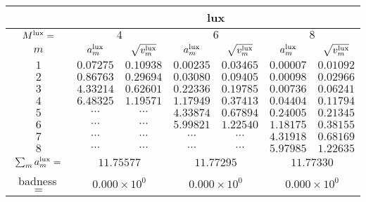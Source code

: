 \begin{tabular}{c|cc|cc|cc|}
&
\multicolumn{6}{|c|}{lux} \\
\hline
$M^{\mathrm{lux}}=$ &
 \multicolumn{2}{|c|}{$4$} &
 \multicolumn{2}{|c|}{$6$} &
 \multicolumn{2}{|c|}{$8$} \\
$m$ &
 $a^{\mathrm{lux}}_m$ & $\sqrt{v^{\mathrm{lux}}_m}$ &
 $a^{\mathrm{lux}}_m$ & $\sqrt{v^{\mathrm{lux}}_m}$ &
 $a^{\mathrm{lux}}_m$ & $\sqrt{v^{\mathrm{lux}}_m}$ \\
$1$ &
 $0.07275$ & $0.10938$ &
 $0.00235$ & $0.03465$ &
 $0.00007$ & $0.01092$ \\
$2$ &
 $0.86763$ & $0.29694$ &
 $0.03080$ & $0.09405$ &
 $0.00098$ & $0.02966$ \\
$3$ &
 $4.33214$ & $0.62601$ &
 $0.22336$ & $0.19785$ &
 $0.00736$ & $0.06241$ \\
$4$ &
 $6.48325$ & $1.19571$ &
 $1.17949$ & $0.37413$ &
 $0.04404$ & $0.11794$ \\
$5$ &
 $\cdots$ & $\cdots$ &
 $4.33874$ & $0.67894$ &
 $0.24005$ & $0.21345$ \\
$6$ &
 $\cdots$ & $\cdots$ &
 $5.99821$ & $1.22540$ &
 $1.18175$ & $0.38155$ \\
$7$ &
 $\cdots$ & $\cdots$ &
 $\cdots$ & $\cdots$ &
 $4.31918$ & $0.68169$ \\
$8$ &
 $\cdots$ & $\cdots$ &
 $\cdots$ & $\cdots$ &
 $5.97985$ & $1.22635$ \\
\hline
$\sum_m a^{\mathrm{lux}}_m=$ &
 \multicolumn{2}{|c|}{$11.75577$} &
 \multicolumn{2}{|c|}{$11.77295$} &
 \multicolumn{2}{|c|}{$11.77330$} \\
badness\,$=$ &
 \multicolumn{2}{|c|}{$0.000\times 10^{0}$} &
 \multicolumn{2}{|c|}{$0.000\times 10^{0}$} &
 \multicolumn{2}{|c|}{$0.000\times 10^{0}$} \\
\end{tabular}
